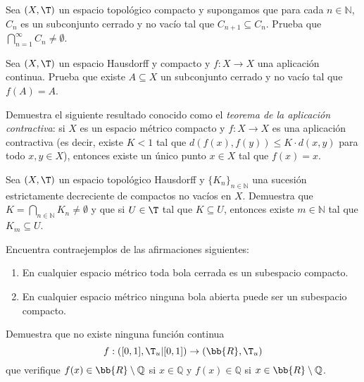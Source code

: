 \begin{ejercicio}
Sea $(X, \T)$ un espacio topológico compacto y supongamos que para cada $n \in \mathbb{N}$, $C_n$ es un subconjunto cerrado y no vacío tal que $C_{n+1} \subseteq C_n$. Prueba que $\bigcap\limits_{n=1}^{\infty} C_n \neq \emptyset$.
\end{ejercicio}

\begin{ejercicio}
Sea $(X, \T)$ un espacio Hausdorff y compacto y $f: X \to X$ una aplicación continua. Prueba que existe $A \subseteq X$ un subconjunto cerrado y no vacío tal que $f(A) = A$.
\end{ejercicio}

\begin{ejercicio}
Demuestra el siguiente resultado conocido como el \emph{teorema de la aplicación contractiva}: si $X$ es un espacio métrico compacto y $f: X \to X$ es una aplicación contractiva (es decir, existe $K < 1$ tal que $d(f(x), f(y)) \leq K \cdot d(x, y)$ para todo $x, y \in X$), entonces existe un único punto $x \in X$ tal que $f(x) = x$.
\end{ejercicio}

\begin{ejercicio}
Sea $(X, \T)$ un espacio topológico Hausdorff y $\{K_n\}_{n \in \mathbb{N}}$ una sucesión estrictamente decreciente de compactos no vacíos en $X$. Demuestra que $K = \bigcap\limits_{n \in \mathbb{N}} K_n \neq \emptyset$ y que si $U \in \T$ tal que $K \subseteq U$, entonces existe $m \in \mathbb{N}$ tal que $K_m \subseteq U$.
\end{ejercicio}

\begin{ejercicio}
Encuentra contraejemplos de las afirmaciones siguientes:
\begin{enumerate}
\item En cualquier espacio métrico toda bola cerrada es un subespacio compacto.
\item En cualquier espacio métrico ninguna bola abierta puede ser un subespacio compacto.
\end{enumerate}
\end{ejercicio}

\begin{ejercicio}
Demuestra que no existe ninguna función continua \[f: ([0, 1], \T_u|[0,1]) \to (\bb{R}, \T_u)\] que verifique $f(x) \in \bb{R} \setminus \mathbb{Q}$ si $x \in \mathbb{Q}$ y $f(x) \in \mathbb{Q}$ si $x \in \bb{R} \setminus \mathbb{Q}$.
\end{ejercicio}

